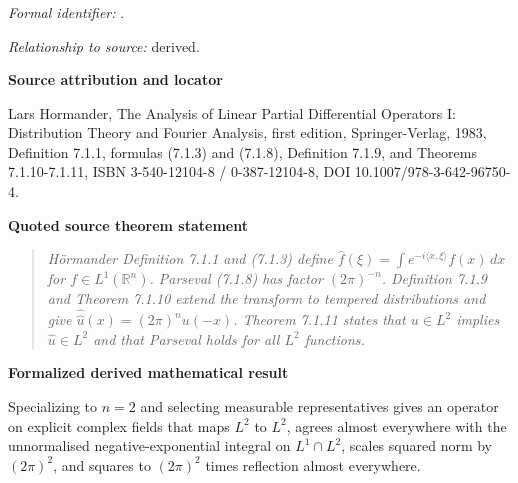 \documentclass[10pt,oneside]{article}
\newenvironment{sourcequote}{\begin{quote}\itshape}{\end{quote}}
\newcommand{\reviewlabel}[1]{\par\smallskip\noindent\textsf{\bfseries #1}\par\smallskip}
\begin{document}
\subsubsection{\texttt{}}
\noindent\textit{Formal identifier:} \texttt{}.\par
\noindent\textit{Relationship to source:} derived.

\reviewlabel{Source attribution and locator}
Lars Hormander, The Analysis of Linear Partial Differential Operators I: Distribution Theory and Fourier Analysis, first edition, Springer-Verlag, 1983, Definition 7.1.1, formulas (7.1.3) and (7.1.8), Definition 7.1.9, and Theorems 7.1.10-7.1.11, ISBN 3-540-12104-8 / 0-387-12104-8, DOI 10.1007/978-3-642-96750-4.

\reviewlabel{Quoted source theorem statement}
\begin{sourcequote}
H\"ormander Definition 7.1.1 and (7.1.3) define $\widehat f(\xi)=\int e^{-i\langle x,\xi\rangle}f(x)\,dx$ for $f\in L^1(\mathbb R^n)$. Parseval (7.1.8) has factor $(2\pi)^{-n}$. Definition 7.1.9 and Theorem 7.1.10 extend the transform to tempered distributions and give $\widehat{\widehat u}(x)=(2\pi)^n u(-x)$. Theorem 7.1.11 states that $u\in L^2$ implies $\widehat u\in L^2$ and that Parseval holds for all $L^2$ functions.
\end{sourcequote}

\reviewlabel{Formalized derived mathematical result}
Specializing to $n=2$ and selecting measurable representatives gives an operator on explicit complex fields that maps $L^2$ to $L^2$, agrees almost everywhere with the unnormalised negative-exponential integral on $L^1\cap L^2$, scales squared norm by $(2\pi)^2$, and squares to $(2\pi)^2$ times reflection almost everywhere.
\end{document}
